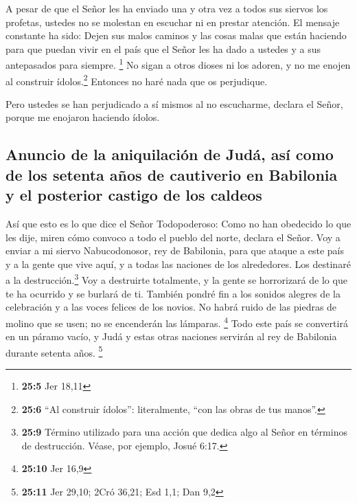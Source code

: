  A pesar de que el Señor les ha enviado una y otra vez a
todos sus siervos los profetas, ustedes no se molestan en escuchar ni en
prestar atención.  El mensaje constante ha sido: Dejen sus
malos caminos y las cosas malas que están haciendo para que puedan vivir
en el país que el Señor les ha dado a ustedes y a sus antepasados para
siempre. \footnote{\textbf{25:5} Jer 18,11}  No sigan a
otros dioses ni los adoren, y no me enojen al construir
ídolos.\footnote{\textbf{25:6} ``Al construir ídolos'': literalmente,
  ``con las obras de tus manos''.} Entonces no haré nada que os
perjudique.

 Pero ustedes se han perjudicado a sí mismos al no
escucharme, declara el Señor, porque me enojaron haciendo ídolos.

\hypertarget{anuncio-de-la-aniquilaciuxf3n-de-juduxe1-asuxed-como-de-los-setenta-auxf1os-de-cautiverio-en-babilonia-y-el-posterior-castigo-de-los-caldeos}{%
\subsection{Anuncio de la aniquilación de Judá, así como de los setenta
años de cautiverio en Babilonia y el posterior castigo de los
caldeos}\label{anuncio-de-la-aniquilaciuxf3n-de-juduxe1-asuxed-como-de-los-setenta-auxf1os-de-cautiverio-en-babilonia-y-el-posterior-castigo-de-los-caldeos}}

 Así que esto es lo que dice el Señor Todopoderoso: Como
no han obedecido lo que les dije,  miren cómo convoco a
todo el pueblo del norte, declara el Señor. Voy a enviar a mi siervo
Nabucodonosor, rey de Babilonia, para que ataque a este país y a la
gente que vive aquí, y a todas las naciones de los alrededores. Los
destinaré a la destrucción.\footnote{\textbf{25:9} Término utilizado
  para una acción que dedica algo al Señor en términos de destrucción.
  Véase, por ejemplo, Josué 6:17.} Voy a destruirte totalmente, y la
gente se horrorizará de lo que te ha ocurrido y se burlará de ti.
 También pondré fin a los sonidos alegres de la
celebración y a las voces felices de los novios. No habrá ruido de las
piedras de molino que se usen; no se encenderán las lámparas.
\footnote{\textbf{25:10} Jer 16,9}  Todo este país se
convertirá en un páramo vacío, y Judá y estas otras naciones servirán al
rey de Babilonia durante setenta años. \footnote{\textbf{25:11} Jer
  29,10; 2Cró 36,21; Esd 1,1; Dan 9,2}

